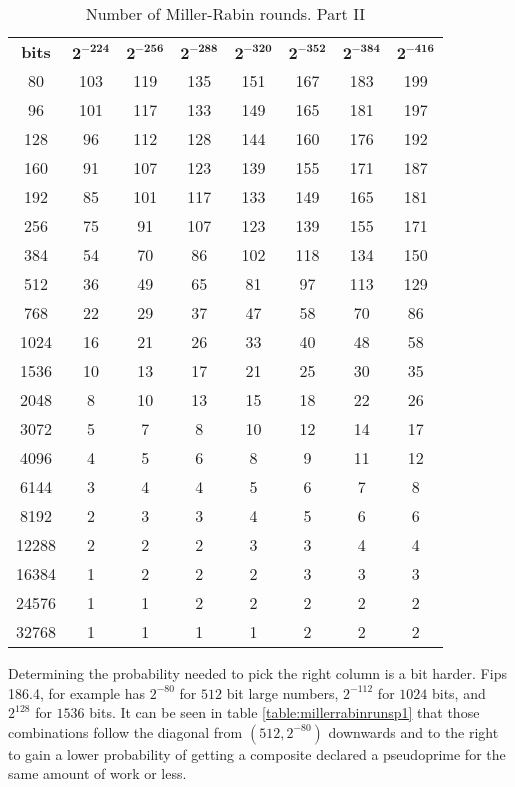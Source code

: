 \documentclass[synpaper]{book}
\begin{document}
\begin{table}[h]
\begin{center}
\begin{tabular}{c c c c c c c c}
\textbf{bits} &$\mathbf{2^{-224}}$ & $\mathbf{2^{-256}}$ & $\mathbf{2^{-288}}$ & $\mathbf{2^{-320}}$ & $\mathbf{2^{-352}}$ & $\mathbf{2^{-384}}$ & $\mathbf{2^{-416}}$\\
80    & 103 & 119 & 135 & 151 & 167 & 183 & 199 \\
96    & 101 & 117 & 133 & 149 & 165 & 181 & 197 \\
128   & 96  & 112 & 128 & 144 & 160 & 176 & 192 \\
160   & 91  & 107 & 123 & 139 & 155 & 171 & 187 \\
192   & 85  & 101 & 117 & 133 & 149 & 165 & 181 \\
256   & 75  & 91  & 107 & 123 & 139 & 155 & 171 \\
384   & 54  & 70  & 86  & 102 & 118 & 134 & 150 \\
512   & 36  & 49  & 65  & 81  & 97  & 113 & 129 \\
768   & 22  & 29  & 37  & 47  & 58  & 70  & 86  \\
1024  & 16  & 21  & 26  & 33  & 40  & 48  & 58  \\
1536  & 10  & 13  & 17  & 21  & 25  & 30  & 35  \\
2048  & 8   & 10  & 13  & 15  & 18  & 22  & 26  \\
3072  & 5   & 7   & 8	& 10  & 12  & 14  & 17  \\
4096  & 4   & 5   & 6	& 8   & 9   & 11  & 12  \\
6144  & 3   & 4   & 4	& 5   & 6   & 7   & 8	\\
8192  & 2   & 3   & 3	& 4   & 5   & 6   & 6	\\
12288 & 2   & 2   & 2	& 3   & 3   & 4   & 4	\\
16384 & 1   & 2   & 2	& 2   & 3   & 3   & 3	\\
24576 & 1   & 1   & 2	& 2   & 2   & 2   & 2	\\
32768 & 1   & 1   & 1	& 1   & 2   & 2   & 2
\end{tabular}
\caption{ Number of Miller-Rabin rounds. Part II } \label{table:millerrabinrunsp2}
\end{center}
\end{table}

Determining the probability needed to pick the right column is a bit harder. Fips 186.4, for example has $2^{-80}$ for $512$ bit large numbers, $2^{-112}$ for $1024$ bits, and $2^{128}$ for $1536$ bits. It can be seen in table \ref{table:millerrabinrunsp1} that those combinations follow the diagonal from $(512,2^{-80})$ downwards and to the right to gain a lower probability of getting a composite declared a pseudoprime for the same amount of work or less.
\end{document}
